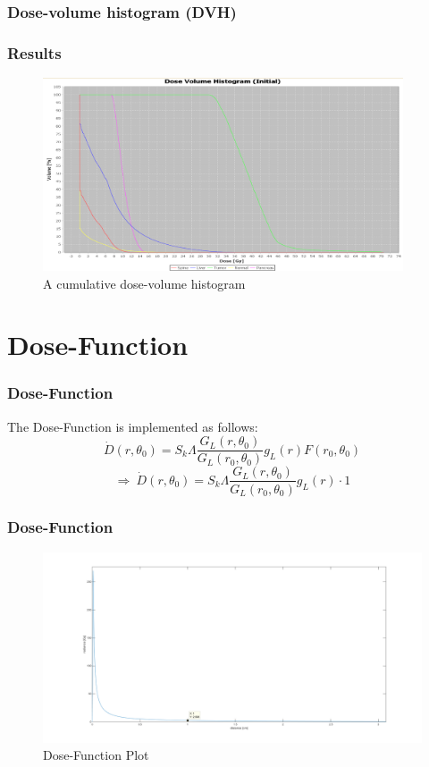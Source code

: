 \documentclass{beamer}
\begin{document}
	\subsubsection{Dose-volume histogram (DVH)}	
		\begin{frame}
		\frametitle{Results}
			\begin{figure}[h]
			\centering
			\includegraphics[width=0.95\textwidth]{pictures/DVH}
			\caption{A cumulative dose-volume histogram}
			\end{figure}
		\end{frame}
		


\section{Dose-Function}
\frame{\tableofcontents[currentsection]}
\begin{frame}
\frametitle{Dose-Function}
The Dose-Function is implemented as follows:
\begin{equation}
\dot{D}(r,\theta_{0})= S_{k}\Lambda \frac{G_{L}(r,\theta_{0})}{G_{L}(r_{0},\theta_{0})} g_{L}(r) F(r_{0},\theta_{0})
\end{equation}
\begin{equation}
\Rightarrow \ \dot{D}(r,\theta_{0})= S_{k}\Lambda \frac{G_{L}(r,\theta_{0})}{G_{L}(r_{0},\theta_{0})} g_{L}(r) \cdot 1
\end{equation}
\end{frame}


\begin{frame}
\frametitle{Dose-Function}
	\begin{figure}[h]
	\centering
	\includegraphics[width=1\textwidth]{pictures/dosefunction}
	\caption{Dose-Function Plot}
	\end{figure}
 
 
\end{frame}
\end{document}

